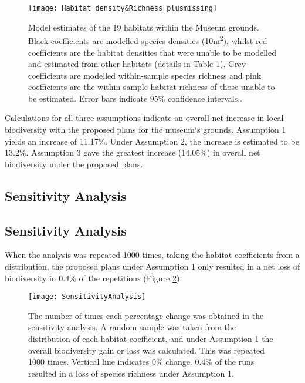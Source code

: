 \begin{figure}[t]
	\centering
	\texttt{[image: Habitat\_density\&Richness\_plusmissing]}
	\caption{Model estimates of the 19 habitats within the Museum grounds. Black coefficients are modelled species densities (10m\textsuperscript{2}), whilst red coefficients are the habitat densities that were unable to be modelled and estimated from other habitats (details in Table 1). Grey coefficients are modelled within-sample species richness and pink coefficients are the within-sample habitat richness of those unable to be estimated. Error bars indicate 95\% confidence intervals..}
   	 \label{fig:wlgmodel}
\end{figure}
	
Calculations for all three assumptions indicate an overall net increase in local biodiversity with the proposed plans for the museum`s grounds. Assumption 1 yields an increase of 11.17\%. Under Assumption 2, the increase is estimated to be 13.2\%. Assumption 3 gave the greatest increase (14.05\%) in overall net biodiversity under the proposed plans.

\ifappendixStyle %
\subsection{Sensitivity Analysis}%
\else
\subsection*{Sensitivity Analysis}
\fi

When the analysis was repeated 1000 times, taking the habitat coefficients from a distribution, the proposed plans under Assumption 1 only resulted in a net loss of biodiversity in 0.4\% of the repetitions (Figure \ref{fig:wlgsensitivity}).

\begin{figure}[t]
	\centering
	\texttt{[image: SensitivityAnalysis]}
	\caption{The number of times each percentage change was obtained in the sensitivity analysis.  A random sample was taken from the distribution of each habitat coefficient, and under Assumption 1 the overall biodiversity gain or loss was calculated. This was repeated 1000 times. Vertical line indicates 0\% change. 0.4\% of the runs resulted in a loss of species richness under Assumption 1.}
   	 \label{fig:wlgsensitivity}
\end{figure}

\ifappendixStyle %
